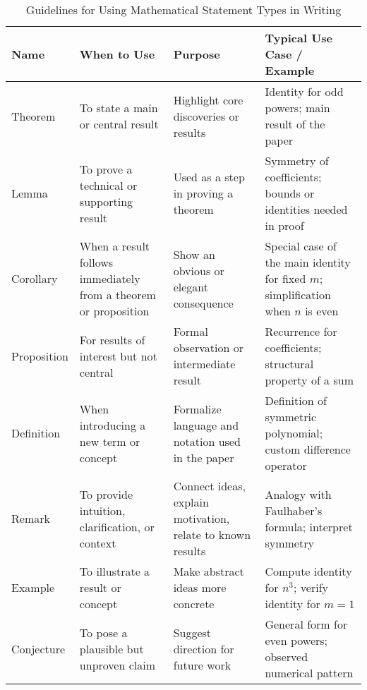 \documentclass[10pt,letterpaper,oneside,reqno]{amsart}
\begin{document}
    \begin{table}[h!]
        \centering
        \begin{tabular}{|l|p{3.3cm}|p{3.6cm}|p{4.5cm}|}
            \hline
            \textbf{Name} & \textbf{When to Use}                                            & \textbf{Purpose}                                           & \textbf{Typical Use Case / Example}                                                      \\
            \hline
            Theorem       & To state a main or central result                               & Highlight core discoveries or results                      & Identity for odd powers; main result of the paper                                        \\
            \hline
            Lemma         & To prove a technical or supporting result                       & Used as a step in proving a theorem & Symmetry of coefficients; bounds or identities needed in proof \\
            \hline
            Corollary     & When a result follows immediately from a theorem or proposition & Show an obvious or elegant consequence & Special case of the main identity for fixed \( m \); simplification when \( n \) is even \\
            \hline
            Proposition   & For results of interest but not central                         & Formal observation or intermediate result & Recurrence for coefficients; structural property of a sum \\
            \hline
            Definition    & When introducing a new term or concept                          & Formalize language and notation used in the paper & Definition of symmetric polynomial; custom difference operator \\
            \hline
            Remark        & To provide intuition, clarification, or context                 & Connect ideas, explain motivation, relate to known results & Analogy with Faulhaber's formula; interpret symmetry \\
            \hline
            Example       & To illustrate a result or concept                               & Make abstract ideas more concrete                          & Compute identity for \( n^3 \); verify identity for \( m = 1 \)                          \\
            \hline
            Conjecture    & To pose a plausible but unproven claim                          & Suggest direction for future work & General form for even powers; observed numerical pattern \\
            \hline
        \end{tabular}
        \caption{Guidelines for Using Mathematical Statement Types in Writing}\label{tab:table}
    \end{table}
\end{document}
